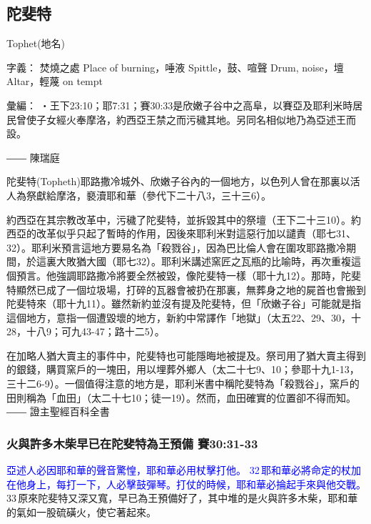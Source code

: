\subsection{陀斐特}
Tophet(地名)

字義：    焚燒之處 Place of burning，唾液 Spittle，鼓、喧聲 Drum, noise，壇 Altar，輕蔑 on tempt

彙編：    ‧王下23:10；耶7:31；賽30:33是欣嫩子谷中之高阜，以賽亞及耶利米時居民曾使子女經火奉摩洛，約西亞王禁之而污穢其地。另同名相似地乃為亞述王而設。

―― 陳瑞庭

 

陀斐特(Topheth)耶路撒冷城外、欣嫩子谷內的一個地方，以色列人曾在那裏以活人為祭獻給摩洛，褻瀆耶和華（參代下二十八3，三十三6）。

約西亞在其宗教改革中，污穢了陀斐特，並拆毀其中的祭壇（王下二十三10）。約西亞的改革似乎只起了暫時的作用，因後來耶利米對這惡行加以譴責（耶七31、32）。耶利米預言這地方要易名為「殺戮谷」，因為巴比倫人會在圍攻耶路撒冷期間，於這裏大敗猶大國（耶七32）。耶利米講述窯匠之瓦瓶的比喻時，再次重複這個預言。他強調耶路撒冷將要全然被毀，像陀斐特一樣（耶十九12）。那時，陀斐特顯然已成了一個垃圾場，打碎的瓦器會被扔在那裏，無葬身之地的屍首也會搬到陀斐特來（耶十九11）。雖然新約並沒有提及陀斐特，但「欣嫩子谷」可能就是指這個地方，意指一個遭毀壞的地方，新約中常譯作「地獄」（太五22、29、30，十28，十八9；可九43-47；路十二5）。

在加略人猶大賣主的事件中，陀斐特也可能隱晦地被提及。祭司用了猶大賣主得到的銀錢，購買窯戶的一塊田，用以埋葬外鄉人（太二十七9、10；參耶十九1-13，三十二6-9）。一個值得注意的地方是，耶利米書中稱陀斐特為「殺戮谷」，窯戶的田則稱為「血田」（太二十七10；徒一19）。然而，血田確實的位置卻不得而知。―― 證主聖經百科全書

\subsubsection{火與許多木柴早已在陀斐特為王預備 賽30:31-33}
\textcolor{blue}{亞述人必因耶和華的聲音驚惶，耶和華必用杖擊打他。 32 耶和華必將命定的杖加在他身上，每打一下，人必擊鼓彈琴。打仗的時候，耶和華必掄起手來與他交戰。} 33 原來陀斐特又深又寬，早已為王預備好了，其中堆的是火與許多木柴，耶和華的氣如一股硫磺火，使它著起來。














